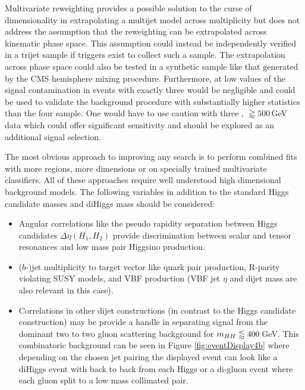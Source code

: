 Multivariate reweighting provides a possible solution to the curse of dimensionality in extrapolating a multijet model across \bjet multiplicity but
does not address the assumption that the reweighting can be extrapolated across kinematic phase space.
This assumption could instead be independently verified in a trijet sample if triggers exist to collect such a sample.
The extrapolation across phase space could also be tested in a synthetic sample like that generated by the CMS hemisphere mixing procedure.
Furthermore, at low values of \mhh the signal contamination in events with exactly three \bjets would be negligible and could be used to validate the background procedure with substantially higher statistics than the four \bjet sample.
One would have to use caution with three \bjet, \mhh$\gtrapprox 500\,$GeV data which could offer significant sensitivity and should be explored as an additional signal selection.

The most obvious approach to improving any search is to perform combined fits with more regions, more dimensions or on specially trained multivariate classifiers.
All of these approaches require well understood high dimensional background models.
The following variables in addition to the standard Higgs candidate masses and diHiggs mass \mhh should be considered:
\begin{itemize}
\item Angular correlations like the pseudo rapidity separation between Higgs candidates $\Delta\eta(H_1,H_2)$ provide discrimination between scalar and tensor resonances and low mass pair Higgsino production.
\item ($b$-)jet multiplicity to target vector like quark pair production, R-parity violating SUSY models, and VBF \hh production (VBF jet $\eta$ and dijet mass are also relevant in this case).
\item Correlations in other dijet constructions (in contrast to the Higgs candidate construction) may be provide a handle in separating signal
  from the dominant two to two gluon scattering background for $m_{HH}\lessapprox 400\,$GeV.
  This combinatoric background can be seen in Figure \ref{fig:eventDisplay4b} where depending on the chosen jet pairing
  the displayed event can look like a diHiggs event with back to back \bjets from each Higgs or a di-gluon event where each gluon split to a low mass collimated \bb pair. 
\end{itemize}

